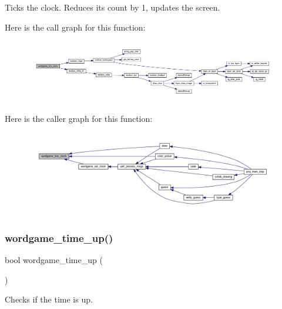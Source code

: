 Ticks the clock. Reduces its count by 1, updates the screen. 

Here is the call graph for this function\+:\nopagebreak
\begin{figure}[H]
\begin{center}
\leavevmode
\includegraphics[width=350pt]{group__wordpicker_gac2b5613b65b81d59f2265c357fd5cdae_cgraph}
\end{center}
\end{figure}
Here is the caller graph for this function\+:\nopagebreak
\begin{figure}[H]
\begin{center}
\leavevmode
\includegraphics[width=350pt]{group__wordpicker_gac2b5613b65b81d59f2265c357fd5cdae_icgraph}
\end{center}
\end{figure}
\mbox{\label{group__wordpicker_ga9ec7ee484cb29f6d473530e913fe02f9}} 
\subsubsection{\texorpdfstring{wordgame\+\_\+time\+\_\+up()}{wordgame\_time\_up()}}
{\footnotesize\ttfamily bool wordgame\+\_\+time\+\_\+up (\begin{DoxyParamCaption}{ }\end{DoxyParamCaption})}



Checks if the time is up. 

